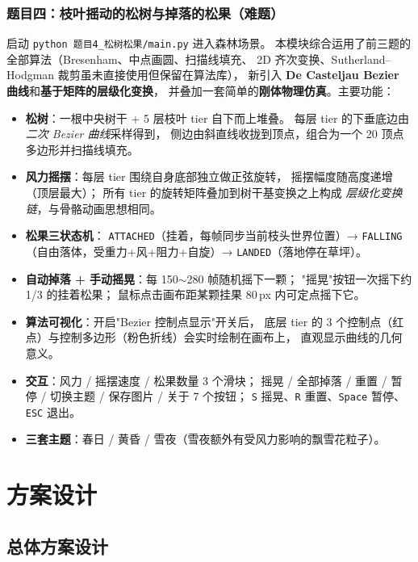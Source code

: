 \documentclass[12pt, a4paper]{article}
\begin{document}
\subsubsection*{题目四：枝叶摇动的松树与掉落的松果（难题）}
启动 \texttt{python 题目4\_松树松果/main.py} 进入森林场景。
本模块综合运用了前三题的全部算法（Bresenham、中点画圆、扫描线填充、
2D 齐次变换、Sutherland--Hodgman 裁剪虽未直接使用但保留在算法库），
新引入 \textbf{De Casteljau Bezier 曲线}和\textbf{基于矩阵的层级化变换}，
并叠加一套简单的\textbf{刚体物理仿真}。主要功能：
\begin{itemize}[leftmargin=*]
    \item \textbf{松树}：一根中央树干 + 5 层枝叶 tier 自下而上堆叠。
    每层 tier 的下垂底边由\textit{二次 Bezier 曲线}采样得到，
    侧边由斜直线收拢到顶点，组合为一个 20 顶点多边形并扫描线填充。
    \item \textbf{风力摇摆}：每层 tier 围绕自身底部独立做正弦旋转，
    摇摆幅度随高度递增（顶层最大）；
    所有 tier 的旋转矩阵叠加到树干基变换之上构成
    \textit{层级化变换链}，与骨骼动画思想相同。
    \item \textbf{松果三状态机}：
    \texttt{ATTACHED}（挂着，每帧同步当前枝头世界位置）→
    \texttt{FALLING}（自由落体，受重力+风+阻力+自旋）→
    \texttt{LANDED}（落地停在草坪）。
    \item \textbf{自动掉落 + 手动摇晃}：每 150$\sim$280 帧随机摇下一颗；
    "摇晃"按钮一次摇下约 1/3 的挂着松果；
    鼠标点击画布距某颗挂果 80\,px 内可定点摇下它。
    \item \textbf{算法可视化}：开启"Bezier 控制点显示"开关后，
    底层 tier 的 3 个控制点（红点）与控制多边形（粉色折线）会实时绘制在画布上，
    直观显示曲线的几何意义。
    \item \textbf{交互}：风力 / 摇摆速度 / 松果数量 3 个滑块；
    摇晃 / 全部掉落 / 重置 / 暂停 / 切换主题 / 保存图片 / 关于 7 个按钮；
    \texttt{S} 摇晃、\texttt{R} 重置、\texttt{Space} 暂停、\texttt{ESC} 退出。
    \item \textbf{三套主题}：春日 / 黄昏 / 雪夜（雪夜额外有受风力影响的飘雪花粒子）。
\end{itemize}

\section{方案设计}\label{sec:three}

\subsection{总体方案设计}
\end{document}
